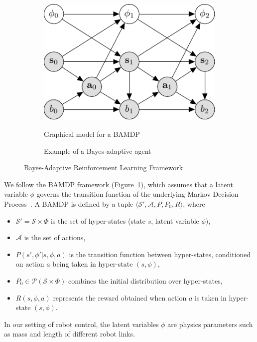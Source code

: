 \documentclass{article}
\newcommand{\figref}[1]{Figure~\ref{#1}}%
\begin{document}
\begin{figure}[t!]
\centering
\begin{subfigure}[b]{0.45\columnwidth}
\includegraphics[width=1\linewidth]{figs/model.pdf}
\label{fig:pgm}
\caption{Graphical model for a BAMDP}
\end{subfigure}
\hfill
\begin{subfigure}[b]{0.45\columnwidth}
\caption{Example of a Bayes-adaptive agent}
\end{subfigure}
\caption{Bayes-Adaptive Reinforcement Learning Framework}
\end{figure}

We follow the BAMDP framework (\figref{fig:pgm}), which assumes that a latent variable $\phi$ governs the transition function of the underlying Markov Decision Process~\cite{ghavamzadeh2015bayesian, ross2008bayes, guez2012efficient}.
A BAMDP is defined by a tuple $\langle \mathcal{S}', \mathcal{A}, P, P_0, R \rangle$, where
\begin{itemize}
\item $\mathcal{S'} = \mathcal{S}\times \Phi$ is the set of hyper-states (state $s$, latent variable $\phi$),
\item $\mathcal{A}$ is the set of actions,
\item $P(s',\phi'|s, \phi, a)$ is the transition function between hyper-states, conditioned
on action $a$ being taken in hyper-state $(s, \phi)$,
\item $P_0\in \mathcal{P}(\mathcal{S} \times \Phi)$ combines the initial distribution over hyper-states,
\item $R(s, \phi, a)$ represents the reward obtained when action $a$ is
taken in hyper-state $(s,\phi)$.
\end{itemize}
In our setting of robot control, the latent variables $\phi$ are physics parameters such as mass and length of different robot links.
\end{document}
